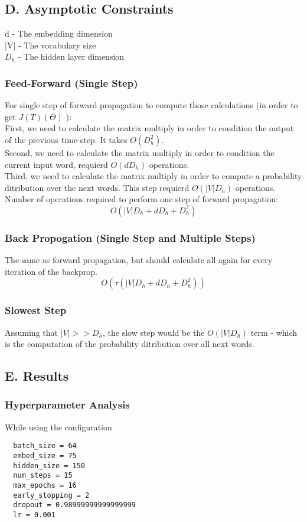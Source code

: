 \documentclass{article}
\begin{document}
\subsection*{D. Asymptotic Constraints}
d - The embedding dimension\\
|V| - The vocabulary size\\
$D_h$ - The hidden layer dimension\\
\subsubsection*{Feed-Forward (Single Step)}

For single step of forward propagation to compute those calculations (in order to get $J(T)(\Theta)$ ):\\
\textbullet First, we need to calculate the matrix multiply in order to condition the output of the previous time-step. It takes $O(D_h^{2})$.\\
\textbullet Second, we need to calculate the matrix multiply in order to condition the current input word, requierd  $O(dD_h)$ operations.\\ 
\textbullet Third, we need to calculate the matrix multiply  in order to compute a probability ditribution over the next words. This step requierd $O(|V|D_h)$ operations.\\

Number of operations required to perform one step of forward propagation:
$$O(|V|D_h + dD_h+D_h^{2})$$

\subsubsection*{Back Propogation (Single Step and Multiple Steps)}
The same as  forward propagation, but should calculate all again for every iteration of the backprop.
$$O(\tau(|V|D_h + dD_h+D_h^{2}))$$

\subsubsection*{Slowest Step}
Assuming that $|V| >> D_h$, the slow step would be the $O(|V|D_h)$ term - which is the computation of the probability ditribution over all next words.


\subsection*{E. Results}
\subsubsection*{Hyperparameter Analysis}
While using the configuration
\begin{lstlisting}
  batch_size = 64
  embed_size = 75
  hidden_size = 150
  num_steps = 15
  max_epochs = 16
  early_stopping = 2
  dropout = 0.98999999999999999
  lr = 0.001
\end{lstlisting}
\end{document}
